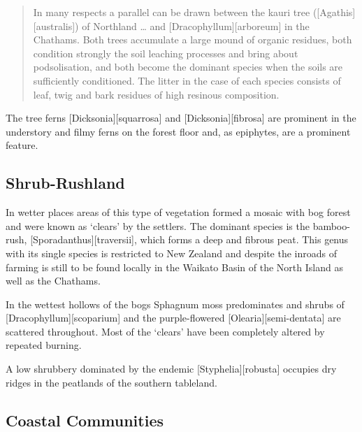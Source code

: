 \begin{quote}
	In many respects a parallel can be drawn between the kauri tree ([Agathis][australis]) of Northland … and [Dracophyllum][arboreum] in the Chathams.
	Both trees accumulate a large mound of organic residues, both condition strongly the soil leaching processes and bring about podsolisation, and both become the dominant species when the soils are sufficiently conditioned.
	The litter in the case of each species consists of leaf, twig and bark residues of high resinous composition.
\end{quote}

The tree ferns [Dicksonia][squarrosa] and [Dicksonia][fibrosa] are prominent in the understory and filmy ferns on the forest floor and, as epiphytes, are a prominent feature.

\subsection{Shrub-Rushland}

In wetter places areas of this type of vegetation formed a mosaic with bog forest and were known as `clears' by the settlers.
The dominant species is the bamboo-rush, [Sporadanthus][traversii], which forms a deep and fibrous peat.
This genus with its single species is restricted to New Zealand and despite the inroads of farming is still to be found locally in the Waikato Basin of the North Island as well as the Chathams.

In the wettest hollows of the bogs Sphagnum moss predominates and shrubs of [Dracophyllum][scoparium] and the purple-flowered [Olearia][semi-dentata] are scattered throughout.
Most of the `clears' have been completely altered by repeated burning.

A low shrubbery dominated by the endemic [Styphelia][robusta] occupies dry ridges in the peatlands of the southern tableland.

\subsection{Coastal Communities}

